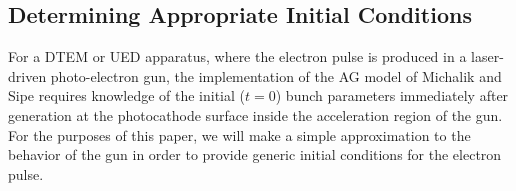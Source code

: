 
\subsection{Determining Appropriate Initial Conditions} \label{sec:initial_conditions}
For a DTEM or UED apparatus, where the electron pulse is produced in a laser-driven photo-electron gun, the implementation of the AG model of Michalik and Sipe \cite{michalik_analytic_2006} requires knowledge of the initial ($ t = 0 $) bunch parameters immediately after generation at the photocathode surface inside the acceleration region of the gun.
For the purposes of this paper, we will make a simple approximation to the behavior of the gun in order to provide generic initial conditions for the electron pulse.

